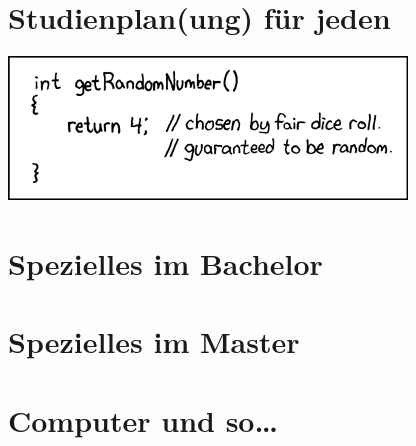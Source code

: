 \documentclass[
  final,
  a4paper,              %
  style=screen,
  twoside,
  nexus,                %
  lnum,                 %
]{tubsartcl}
\begin{document}
	\section{Studienplan(ung) für jeden}
		\label{studienplan}
		\begin{multicols}{2}
		
		\end{multicols}
		\vfill
		\begin{center}
		\includegraphics[totalheight=3cm]{bilder/XKCD/random_number}
		\end{center}
		\vfill
	\newpage

	\section{Spezielles im Bachelor}
		\label{bachelor}
		\begin{multicols}{2}
		
		
		
		\end{multicols}
		

	\section{Spezielles im Master}
		\label{master}
		
	\newpage

	\section{Computer und so\ldots}
		\label{computer}
		

	\newpage
\end{document}
